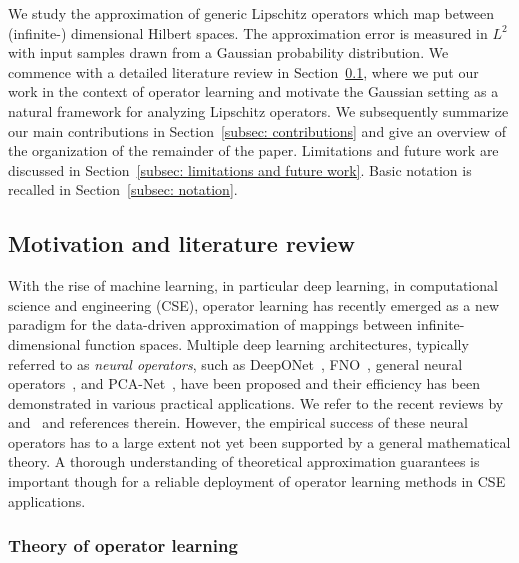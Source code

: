 \documentclass[namedate,webpdf]{ima-authoring-template-blank}
\numberwithin{counter}{section}
\numberwithin{equation}{section}
\theoremstyle{plain}
\theoremstyle{definition}
\theoremstyle{thmstyletwo}
\begin{document}
We study the approximation of generic Lipschitz operators which map between (infinite-) dimensional Hilbert spaces. The approximation error is measured in \(L^2\) with input samples drawn from a Gaussian probability distribution. We commence with a detailed literature review in Section~\ref{subsec: motivation and literature review}, where we put our work in the context of operator learning and motivate the Gaussian setting as a natural framework for analyzing Lipschitz operators. We subsequently summarize our main contributions in Section~\ref{subsec: contributions} and give an overview of the organization of the remainder of the paper. Limitations and future work are discussed in Section~\ref{subsec: limitations and future work}. Basic notation is recalled in Section~\ref{subsec: notation}.



\subsection{Motivation and literature review}
\label{subsec: motivation and literature review}

With the rise of machine learning, in particular deep learning, in computational science and engineering (CSE), operator learning has recently emerged as a new paradigm for the data-driven approximation of mappings between infinite-dimensional function spaces. Multiple deep learning architectures, typically referred to as \emph{neural operators}, such as DeepONet~\citep{lu_LearningNonlinearOperatorsDeepONet_2021}, FNO~\citep{li_FourierNeuralOperatorParametric_2021}, general neural operators~\citep{kovachki_NeuralOperatorLearningMaps_2023}, and PCA-Net~\citep{bhattacharya_ModelReductionNeuralNetworks_2021}, have been proposed and their efficiency has been demonstrated in various practical applications. We refer to the recent reviews by~\citet{kovachki_OperatorLearningAlgorithmsAnalysis_2024} and~\citet{boulle_MathematicalGuideOperatorLearning_2024} and references therein. However, the empirical success of these neural operators has to a large extent not yet been supported by a general mathematical theory. A thorough understanding of theoretical approximation guarantees is important though for a reliable deployment of operator learning methods in CSE applications.



\subsubsection{Theory of operator learning}
\end{document}
